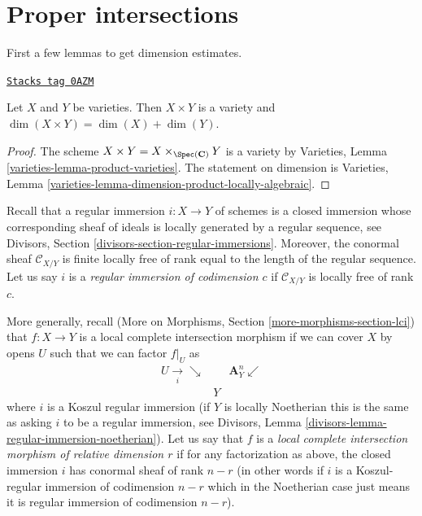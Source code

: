 \section{Proper intersections}
\label{intersection-section-intersect-properly}
First a few lemmas to get dimension estimates.

\begin{lemma}
\label{intersection-lemma-dimension-product-varieties}
\href{https://stacks.math.columbia.edu/tag/0AZM}{\texttt{Stacks tag 0AZM}}

Let $X$ and $Y$ be varieties. Then $X \times Y$ is a variety and
$\dim(X \times Y) = \dim(X) + \dim(Y)$.
\end{lemma}

\begin{proof}
The scheme $X \times Y = X \times_{\Spec(\mathbf{C})} Y$ is a variety by
Varieties, Lemma \ref{varieties-lemma-product-varieties}.
The statement on dimension is
Varieties, Lemma \ref{varieties-lemma-dimension-product-locally-algebraic}.
\end{proof}

Recall that a regular immersion $i : X \to Y$ of schemes
is a closed immersion whose
corresponding sheaf of ideals is locally generated by a regular sequence, see
Divisors, Section \ref{divisors-section-regular-immersions}.
Moreover, the conormal sheaf $\mathcal{C}_{X/Y}$ is finite locally free of
rank equal to the length of the regular sequence. Let us say $i$ is a
{\it regular immersion of codimension $c$}
if $\mathcal{C}_{X/Y}$ is locally free of rank $c$.

\medskip\noindent
More generally, recall
(More on Morphisms, Section \ref{more-morphisms-section-lci})
that $f : X \to Y$ is a local complete intersection
morphism if we can cover $X$ by opens $U$ such that we can factor
$f|_U$ as
$$
\begin{array}{ccc}U \underset{i}{\longrightarrow}\searrow &  & \mathbf{A}^n_Y \swarrow \\  & Y & \end{array}
$$
where $i$ is a Koszul regular immersion (if $Y$ is locally Noetherian
this is the same as asking $i$ to be a regular immersion, see
Divisors, Lemma \ref{divisors-lemma-regular-immersion-noetherian}).
Let us say that $f$ is a {\it local complete intersection morphism
of relative dimension $r$} if for any factorization as above, the
closed immersion $i$ has conormal sheaf of rank $n - r$ (in other
words if $i$ is a Koszul-regular immersion of codimension $n - r$
which in the Noetherian case just means it is regular immersion of
codimension $n - r$).

